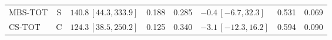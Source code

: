 \begin{longtable}{lcp{37mm}rrp{37mm}rr}
MBS-TOT & S & \(140.8\,[44.3,333.9]\) & 0.188 & 0.285 & \(-0.4\,[-6.7,32.3]\) & 0.531 & 0.069\\
CS-TOT & C & \(124.3\,[38.5,250.2]\) & 0.125 & 0.340 & \(-3.1\,[-12.3,16.2]\) & 0.594 & 0.090\\

\end{longtable}
